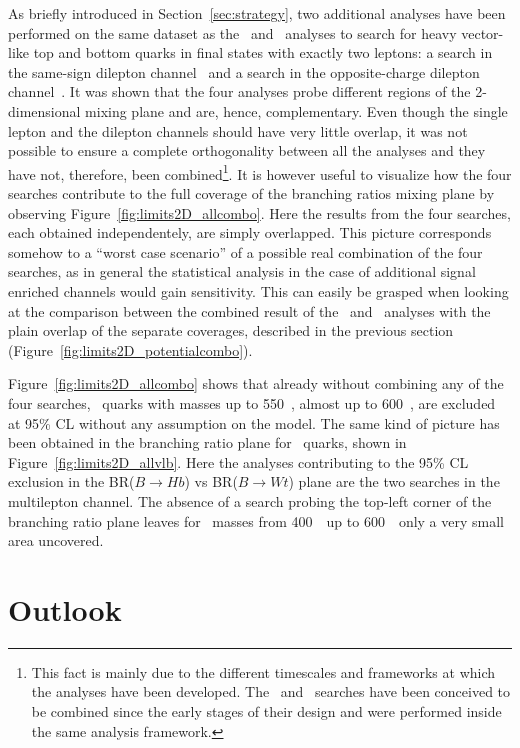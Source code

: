 As briefly introduced in Section~\ref{sec:strategy}, two
additional analyses have been performed on the same dataset
as the \wbx\ and \htx\ analyses to search for heavy vector-like
top and bottom quarks in final states with exactly two leptons:
a search in the same-sign 
dilepton channel~\cite{ATLAS-CONF-2013-051} and 
a search in the opposite-charge dilepton channel~\cite{ATLAS-CONF-2013-056}.
It was shown that the four analyses probe different 
regions of the 2-dimensional mixing plane and are,
hence, complementary. Even though the single lepton and
the dilepton channels should have very little overlap,
it was not possible to ensure a complete
orthogonality between all the analyses and they have
not, therefore, been combined\footnote{This
fact is mainly due to the different timescales
and frameworks at which the analyses have been developed. 
The \wbx\ and \htx\ searches
have been conceived to be combined since the
early stages of their design and were performed
inside the same analysis framework.}.
It is however useful to visualize how
the four searches contribute to the full
coverage of the branching ratios mixing plane by
observing Figure~\ref{fig:limits2D_allcombo}.
Here the results from the four searches,
each obtained independentely, are simply
overlapped. This picture corresponds somehow to
a ``worst case scenario'' of a possible
real combination of the four searches, as
in general the statistical analysis in the
case of additional signal enriched
channels would gain sensitivity. 
This can easily be grasped when looking
at the comparison between the combined result
of the \wbx\ and \htx\ analyses
with the plain overlap of the separate
coverages, described in the previous section 
(Figure~\ref{fig:limits2D_potentialcombo}).

Figure~\ref{fig:limits2D_allcombo} shows that already
without combining any of the four searches,
\T\ quarks with masses up to 550~\gev, almost up
to 600~\gev, are excluded at 95\% CL without 
any assumption on the model. The same kind of
picture has been obtained in the branching ratio plane for
\B\ quarks, shown in Figure~\ref{fig:limits2D_allvlb}.
Here the analyses contributing to the
95\% CL exclusion in the BR($B\to Hb$) vs  BR($B\to Wt$)
plane are the two searches in the multilepton channel.
The absence of a search probing the top-left corner
of the branching ratio plane leaves for \B\ masses from 400~\gev\ up to
600~\gev\ only a very small area uncovered.




\section{Outlook}\label{sec:combOUT}

